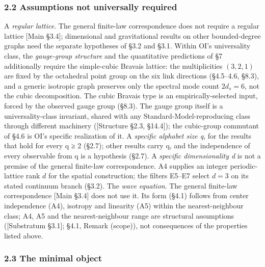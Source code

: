 \documentclass[
]{article}
\begin{document}
\hypertarget{assumptions-not-universally-required}{%
\subsubsection{2.2 Assumptions not universally
required}\label{assumptions-not-universally-required}}

A \emph{regular lattice}. The general finite-law correspondence does not
require a regular lattice {[}Main §3.4{]}; dimensional and gravitational
results on other bounded-degree graphs need the separate hypotheses of
§3.2 and §3.1. Within OI's universality class, the \emph{gauge-group
structure} and the quantitative predictions of §7 additionally require
the simple-cubic Bravais lattice: the multiplicities \((3,2,1)\) are
fixed by the octahedral point group on the six link directions
(§4.5--4.6, §8.3), and a generic isotropic graph preserves only the
spectral mode count \(2d_s = 6\), not the cubic decomposition. The cubic
Bravais type is an empirically-selected input, forced by the observed
gauge group (§8.3). The gauge group itself is a universality-class
invariant, shared with any Standard-Model-reproducing class through
different machinery ({[}Structure §2.3, §14.4{]}); the cubic-group
commutant of §4.6 is OI's specific realization of it. A \emph{specific
alphabet size q}, for the results that hold for every q ≥ 2 (§2.7);
other results carry q, and the independence of every observable from q
is a hypothesis (§2.7). A \emph{specific dimensionality d} is not a
premise of the general finite-law correspondence. A4 supplies an integer
periodic-lattice rank \(d\) for the spatial construction; the filters
E5--E7 select \(d = 3\) on its stated continuum branch (§3.2). The
\emph{wave equation}. The general finite-law correspondence {[}Main
§3.4{]} does not use it. Its form (§4.1) follows from center
independence (A4), isotropy and linearity (A5) within the
nearest-neighbour class; A4, A5 and the nearest-neighbour range are
structural assumptions ({[}Substratum §3.1{]}; §4.1, Remark (scope)),
not consequences of the properties listed above.

\hypertarget{the-minimal-object}{%
\subsubsection{2.3 The minimal object}\label{the-minimal-object}}
\end{document}
